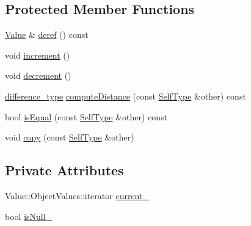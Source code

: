 \subsection*{Protected Member Functions}
\begin{DoxyCompactItemize}
\item 
\hyperlink{classJson_1_1Value}{Value} \& \hyperlink{classJson_1_1ValueIteratorBase_aa5b75c9514a30ba2ea3c9a35c165c18e_aa5b75c9514a30ba2ea3c9a35c165c18e}{deref} () const
\item 
void \hyperlink{classJson_1_1ValueIteratorBase_afe58f9534e1fd2033419fd9fe244551e_afe58f9534e1fd2033419fd9fe244551e}{increment} ()
\item 
void \hyperlink{classJson_1_1ValueIteratorBase_affc8cf5ff54a9f432cc693362c153fa6_affc8cf5ff54a9f432cc693362c153fa6}{decrement} ()
\item 
\hyperlink{classJson_1_1ValueIteratorBase_a4e44bf8cbd17ec8d6e2c185904a15ebd_a4e44bf8cbd17ec8d6e2c185904a15ebd}{difference\+\_\+type} \hyperlink{classJson_1_1ValueIteratorBase_af11473c9e20d07782e42b52a2f9e4540_af11473c9e20d07782e42b52a2f9e4540}{compute\+Distance} (const \hyperlink{classJson_1_1ValueIteratorBase_a9d2a940d03ea06d20d972f41a89149ee_a9d2a940d03ea06d20d972f41a89149ee}{Self\+Type} \&other) const
\item 
bool \hyperlink{classJson_1_1ValueIteratorBase_a010b5ad3f3337ae3732e5d7e16ca5e25_a010b5ad3f3337ae3732e5d7e16ca5e25}{is\+Equal} (const \hyperlink{classJson_1_1ValueIteratorBase_a9d2a940d03ea06d20d972f41a89149ee_a9d2a940d03ea06d20d972f41a89149ee}{Self\+Type} \&other) const
\item 
void \hyperlink{classJson_1_1ValueIteratorBase_a496e6aba44808433ec5858c178be5719_a496e6aba44808433ec5858c178be5719}{copy} (const \hyperlink{classJson_1_1ValueIteratorBase_a9d2a940d03ea06d20d972f41a89149ee_a9d2a940d03ea06d20d972f41a89149ee}{Self\+Type} \&other)
\end{DoxyCompactItemize}
\subsection*{Private Attributes}
\begin{DoxyCompactItemize}
\item 
Value\+::\+Object\+Values\+::iterator \hyperlink{classJson_1_1ValueIteratorBase_ab3138ce8af8301cca3b041ea55cb922a_ab3138ce8af8301cca3b041ea55cb922a}{current\+\_\+}
\item 
bool \hyperlink{classJson_1_1ValueIteratorBase_a3e08b114a1aed9bde518c527f94a8c59_a3e08b114a1aed9bde518c527f94a8c59}{is\+Null\+\_\+}
\end{DoxyCompactItemize}


